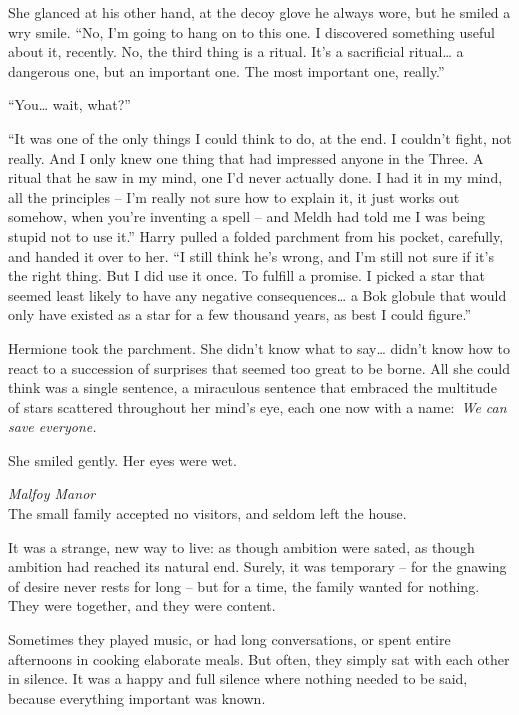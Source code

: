 She glanced at his other hand, at the decoy glove he always wore, but he
smiled a wry smile. ``No, I'm going to hang on to this one. I discovered
something useful about it, recently. No, the third thing is a ritual.
It's a sacrificial ritual\ldots{} a dangerous one, but an important one.
The most important one, really.''

``You\ldots{} wait, what?''

``It was one of the only things I could think to do, at the end. I
couldn't fight, not really. And I only knew one thing that had impressed
anyone in the Three. A ritual that he saw in my mind, one I'd never
actually done. I had it in my mind, all the principles -- I'm really not
sure how to explain it, it just works out somehow, when you're inventing
a spell -- and Meldh had told me I was being stupid not to use it.''
Harry pulled a folded parchment from his pocket, carefully, and handed
it over to her. ``I still think he's wrong, and I'm still not sure if
it's the right thing. But I did use it once. To fulfill a promise. I
picked a star that seemed least likely to have any negative
consequences\ldots{} a Bok globule that would only have existed as a
star for a few thousand years, as best I could figure.''

Hermione took the parchment. She didn't know what to say\ldots{} didn't
know how to react to a succession of surprises that seemed too great to
be borne. All she could think was a single sentence, a miraculous
sentence that embraced the multitude of stars scattered throughout her
mind's eye, each one now with a name:~\emph{We can save everyone.}

She smiled gently. Her eyes were wet.

\mybreak

\emph{Malfoy Manor}\\

The small family accepted no visitors, and seldom left the house.

It was a strange, new way to live: as though ambition were sated, as
though ambition had reached its natural end. Surely, it was temporary --
for the gnawing of desire never rests for long -- but for a time, the
family wanted for nothing. They were together, and they were content.

Sometimes they played music, or had long conversations, or spent entire
afternoons in cooking elaborate meals. But often, they simply sat with
each other in silence. It was a happy and full silence where nothing
needed to be said, because everything important was known.

